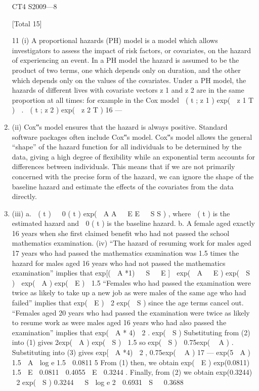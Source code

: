 \documentclass[a4paper,12pt]{article}
\begin{document}
\begin{enumerate}
CT4 S2009—8

[Total 15]

\newpage

11
(i) A proportional hazards (PH) model is a model which allows investigators to
assess the impact of risk factors, or covariates, on the hazard of experiencing
an event.
In a PH model the hazard is assumed to be the product of two terms, one
which depends only on duration, and the other which depends only on the
values of the covariates.
Under a PH model, the hazards of different lives with covariate vectors z 1 and
z 2 are in the same proportion at all times:
for example in the Cox model
 ( t ; z 1 ) exp(  z 1 T )

.
 ( t ; z 2 ) exp(  z 2 T )
16  — %
\item (ii) Cox‟s model ensures that the hazard is always positive. Standard software
packages often include Cox‟s model.
Cox‟s model allows the general “shape” of the hazard function for all
individuals to be determined by the data, giving a high degree of flexibility
while an exponential term accounts for differences between individuals.
This means that if we are not primarily concerned with the precise form of the
hazard, we can ignore the shape of the baseline hazard and estimate the effects
of the covariates from the data directly.
\item (iii)
a.
 ( t )   0 ( t ) exp(  A A   E E   S S ) , where
 ( t )
is the estimated
hazard and  0 ( t ) is the baseline hazard.
b.
A female aged exactly 16 years when she first claimed benefit who had
not passed the school mathematics examination.
(iv) “The hazard of resuming work for males aged 17 years who had passed the
mathematics examination was 1.5 times the hazard for males aged 16 years
who had not passed the mathematics examination” implies that
exp[(  A *1)   S   E ]
 exp(  A   E )
exp(  S )
 exp(  A ) exp(  E )  1.5
“Females who had passed the examination were twice as likely to take up a
new job as were males of the same age who had failed” implies that
exp(  E )
 2
exp(  S )
since the age terms cancel out.
“Females aged 20 years who had passed the examination were twice as likely
to resume work as were males aged 16 years who had also passed the
examination” implies that
exp(  A * 4)
 2 .
exp(  S )
Substituting from (2) into (1) gives
2exp(  A ) exp(  S )  1.5
so
exp(  S )  0.75exp(  A ) .
Substituting into (3) gives
exp[  A *4)
 2 ,
0.75exp(  A )
17  — %
exp(5  A )  1.5
 A 
log e 1.5
 0.0811
5
From (1) then, we obtain
exp(  E ) exp(0.0811)  1.5
 E  0.0811  0.4055
 E  0.3244 .
Finally, from (2) we obtain
exp(0.3244)
 2
exp(  S )
0.3244   S  log e 2  0.6931
 S   0.3688


\end{enumerate}
\end{document}

